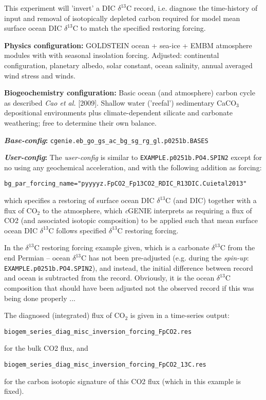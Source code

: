 \documentclass[10pt,twoside]{article}
\begin{document}
This experiment will 'invert' a DIC $\delta^{13}$C record, i.e. diagnose the time-history of input and removal of isotopically depleted carbon required for model mean surface ocean DIC $\delta^{13}$C to match the specified restoring forcing.

\noindent \textbf{Physics configuration:} GOLDSTEIN ocean + sea-ice + EMBM atmosphere modules with with seasonal insolation forcing. Adjusted: continental configuration, planetary albedo, solar constant, ocean salinity, annual averaged wind stress and winds.

\noindent \textbf{Biogeochemistry configuration:} Basic ocean (and atmosphere) carbon cycle as described \textit{Cao et al.} [2009]. Shallow water ('reefal') sedimentary CaCO$_{3}$ depositional environments plus climate-dependent silicate and carbonate weathering; free to determine their own balance.

\noindent \textbf{\textit{Base-config}:} \texttt{cgenie.eb\_go\_gs\_ac\_bg\_sg\_rg\_gl.p0251b.BASES}

\noindent \textbf{\textit{User-config}:} The \textit{user-config} is similar to \texttt{EXAMPLE.p0251b.PO4.SPIN2} except for no using any geochemical acceleration, and with the following addition as forcing:

\vspace{-5pt}\begin{verbatim}
bg_par_forcing_name="pyyyyz.FpCO2_Fp13CO2_RDIC_R13DIC.Cuietal2013"
\end{verbatim}\vspace{-5pt}

\noindent which specifies a restoring of surface ocean DIC $\delta^{13}$C (and DIC) together with a flux of CO$_{2}$ to the atmosphere, which \textit{c}GENIE interprets as requiring a flux of CO2 (and associated isotopic composition) to be applied such that mean surface ocean DIC $\delta^{13}$C follows specified $\delta^{13}$C restoring forcing.

In the $\delta^{13}$C restoring forcing example given, which is a carbonate $\delta^{13}$C from the end Permian -- ocean $\delta^{13}$C has not been pre-adjusted (e.g. during the \textit{spin-up}: \texttt{EXAMPLE.p0251b.PO4.SPIN2}), and instead, the initial difference between record and ocean is subtracted from the record. Obviously, it is the ocean $\delta^{13}$C composition that should have been adjusted not the observed record if this was being done properly ...

The diagnosed (integrated) flux of CO$_{2}$ is given in a time-series output:
\vspace{-10pt}\begin{verbatim}
biogem_series_diag_misc_inversion_forcing_FpCO2.res
\end{verbatim}\vspace{-10pt}
for the bulk CO2 flux, and
\vspace{-10pt}\begin{verbatim}
biogem_series_diag_misc_inversion_forcing_FpCO2_13C.res
\end{verbatim}\vspace{-10pt}
for the carbon isotopic signature of this CO2 flux (which in this example is fixed).
\end{document}
